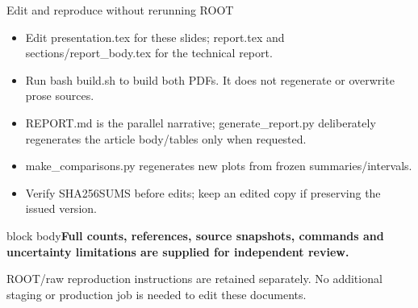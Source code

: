 \documentclass[aspectratio=169,11pt]{beamer}
\newcommand{\source}[1]{\par\vfill{\scriptsize\color{muted}#1\par}}
\newcommand{\takeaway}[1]{\begin{beamercolorbox}[sep=2.5mm,wd=\linewidth]{block body}\textbf{#1}\end{beamercolorbox}}
\begin{document}
\begin{frame}{Edit and reproduce without rerunning ROOT}
\small\begin{itemize}\setlength\itemsep{3mm}
\item Edit presentation.tex for these slides; report.tex and sections/report\_body.tex for the technical report.
\item Run bash build.sh to build both PDFs. It does not regenerate or overwrite prose sources.
\item REPORT.md is the parallel narrative; generate\_report.py deliberately regenerates the article body/tables only when requested.
\item make\_comparisons.py regenerates new plots from frozen summaries/intervals.
\item Verify SHA256SUMS before edits; keep an edited copy if preserving the issued version.
\end{itemize}\takeaway{Full counts, references, source snapshots, commands and uncertainty limitations are supplied for independent review.}
\source{ROOT/raw reproduction instructions are retained separately. No additional staging or production job is needed to edit these documents.}
\end{frame}
\end{document}
